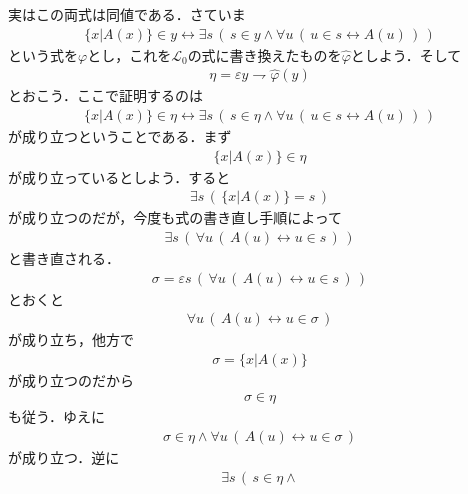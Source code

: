 \begin{itemize}
			実はこの両式は同値である．さていま
			\begin{align}
				\{x|A(x)\} \in y \leftrightarrow
				\exists s\, \left(\, s \in y \wedge 
				\forall u\, \left(\, u \in s \leftrightarrow A(u)\, \right)\, \right)
			\end{align}
			という式を$\varphi$とし，これを$\mathcal{L}_{0}$の式に書き換えたものを$\hat{\varphi}$としよう．そして
			\begin{align}
				\eta = \varepsilon y \rightharpoondown \hat{\varphi}(y)
			\end{align}
			とおこう．ここで証明するのは
			\begin{align}
				\{x|A(x)\} \in \eta \leftrightarrow
				\exists s\, \left(\, s \in \eta \wedge 
				\forall u\, \left(\, u \in s \leftrightarrow A(u)\, \right)\, \right)
			\end{align}
			が成り立つということである．まず
			\begin{align}
				\{x|A(x)\} \in \eta
			\end{align}
			が成り立っているとしよう．すると
			\begin{align}
				\exists s\, \left(\, \{x|A(x)\} = s\, \right)
			\end{align}
			が成り立つのだが，今度も式の書き直し手順によって
			\begin{align}
				\exists s\, \left(\, \forall u\, \left(\, A(u) \leftrightarrow
				u \in s\, \right)\, \right)
			\end{align}
			と書き直される．
			\begin{align}
				\sigma = \varepsilon s\, \left(\, \forall u\, \left(\, A(u) \leftrightarrow
				u \in s\, \right)\, \right)
			\end{align}
			とおくと
			\begin{align}
				\forall u\, \left(\, A(u) \leftrightarrow
				u \in \sigma\, \right)
			\end{align}
			が成り立ち，他方で
			\begin{align}
				\sigma = \{x|A(x)\}
			\end{align}
			が成り立つのだから
			\begin{align}
				\sigma \in \eta
			\end{align}
			も従う．ゆえに
			\begin{align}
				\sigma \in \eta \wedge \forall u\, \left(\, A(u) \leftrightarrow
				u \in \sigma\, \right)
			\end{align}
			が成り立つ．逆に
			\begin{align}
				\exists s\, \left(\, s \in \eta \wedge 

\end{align}
\end{itemize}
